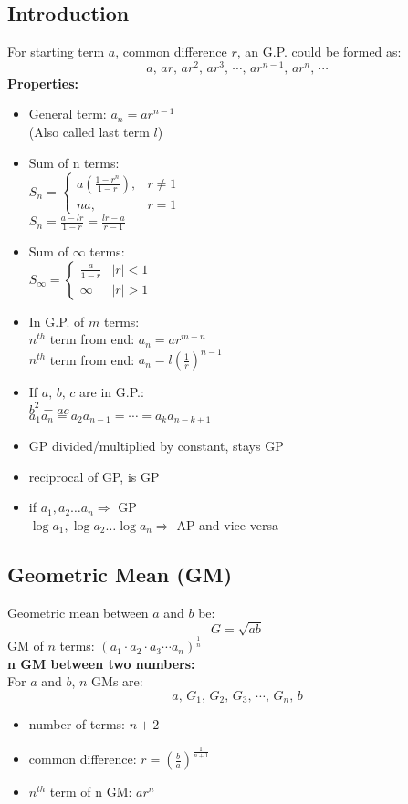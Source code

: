 \documentclass[11pt,a4paper,landscape]{article}
\begin{document}
\begin{multicols*}{3}
	\subsection{Introduction}
	For starting term $a$, common difference $r$, an G.P. could be formed as:
	$$a,\,ar,\,ar^2,\,ar^3,\,\cdots,\,ar^{n-1},\,ar^n,\,\cdots$$
	\textbf{\large{Properties:}}
	\begin{itemize}
	\item General term: $a_n = ar^{n-1}$\\
		(Also called last term $l$)
	\item Sum of n terms:\\
		$
		S_n=
		\begin{cases}
		a\left(\frac{1-r^{n}}{1-r} \right), & r \neq 1\\
		na, & r=1
		\end{cases}
		$\\
		$S_n = \frac{a-lr}{1-r}= \frac{lr-a}{r-1}$
	\item Sum of $\infty$ terms:\\
		$
		S_\infty =
		\begin{cases}
		\frac{a}{1-r} & |r|<1\\
		\infty & |r|>1
		\end{cases}
		$
	\item In G.P. of $m$ terms:\\
		$n^{th}$ term from end: $a_n = ar^{m-n}$\\
		$n^{th}$ term from end: $a_n= l \left({\frac{1}{r}} \right)^{n-1}$
	\item If $a,\,b,\,c$ are in G.P.:\\
		$b^2 = ac$\\
		$a_1 a_n = a_2 a_{n-1} =\cdots= a_k a_{n-k+1}$
	\item GP divided/multiplied by constant, stays GP
	\item reciprocal of GP, is GP
	\item if  $a_1,a_2 \ldots a_n \Rightarrow$ GP \\
		$\log a_1, \log a_2 \ldots \log a_n \Rightarrow$ AP and vice-versa	
	\end{itemize}
	\subsection{Geometric Mean (GM)}
	Geometric mean between $a$ and $b$ be:
	$$G=\sqrt{ab}$$
	GM of $n$ terms: $(a_1\cdot a_2\cdot a_3\cdots a_n)^{\frac{1}{n}}$\\
	\textbf{n GM between two numbers:}\\
	For $a$ and $b$, $n$ GMs are:
	$$a,\,G_1,\,G_2,\,G_3,\,\cdots,\,G_n,\,b$$
	\begin{itemize}
	\item number of terms: $n+2$
	\item common difference: $r=\left(\frac{b}{a}\right)^{\frac{1}{n+1}}$
	\item $n^{th}$ term of n GM: $ar^n$
	\end{itemize}
\vfill\null
\columnbreak

\end{multicols*}
\end{document}
